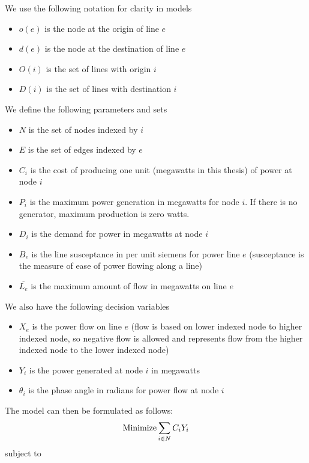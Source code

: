 \documentclass{article}
\begin{document}
		
		We use the following notation for clarity in models
	\begin{itemize}
		\item $o(e)$ is the node at the origin of line $e$ 
		\item $d(e)$ is the node at the destination of line $e$
		\item $O(i)$ is the set of lines with origin $i$
		\item $D(i)$ is the set of lines with destination $i$
	\end{itemize}
	We define the following parameters and sets
	\begin{itemize}
		\item $N$ is the set of nodes indexed by $i$
		\item $E$ is the set of edges indexed by $e$
		\item $C_i$ is the cost of producing one unit (megawatts in this thesis) of power at node $i$
		\item $P_i$ is the maximum power generation in megawatts for node $i$. If there is no generator, maximum production is zero watts.
		\item $D_i$ is the demand for power in megawatts at node $i$
		\item $B_e$ is the line susceptance in per unit siemens for power line $e$ (susceptance is the measure of ease of power flowing along a line)
		\item $\overline{L_e}$ is the maximum amount of flow in megawatts on line $e$
	
	\end{itemize}
	We also have the following decision variables
	\begin{itemize}
	\item $X_e$ is the power flow on line $e$ (flow is based on lower indexed node to higher indexed node, so negative flow is allowed and represents flow from the higher indexed node to the lower indexed node)
	\item $Y_i$ is the power generated at node $i$ in megawatts
	\item $\theta_i$ is the phase angle in radians for power flow at node $i$ 
	\end{itemize}
	The model can then be formulated as follows: 
	\begin{equation}
\textnormal{Minimize} \sum_{i\in N} C_i Y_i
	\end{equation} 
	subject to
\end{document}
